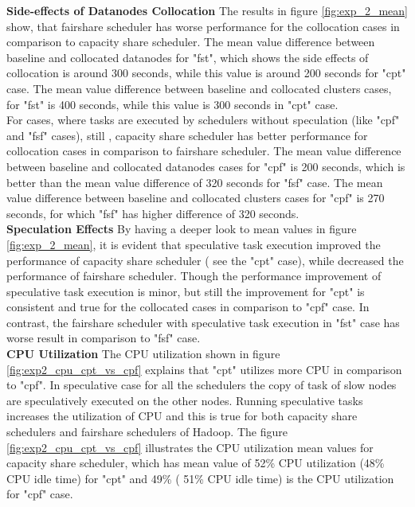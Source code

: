 \textbf{Side-effects of Datanodes Collocation } The results in figure \ref{fig:exp_2_mean} show, that fairshare scheduler has worse performance for the collocation cases in comparison to capacity share scheduler. The mean value difference between baseline and collocated datanodes for "fst", which shows the side effects of collocation is around 300 seconds, while this value is around 200 seconds for "cpt" case. The mean value difference between baseline and collocated clusters cases, for "fst" is 400 seconds, while this value is 300 seconds in "cpt" case.\\ 

For cases, where tasks are executed by schedulers without speculation (like "cpf" and "fsf" cases), still , capacity share scheduler has better performance for collocation cases in comparison to fairshare scheduler. The mean value difference between baseline and collocated datanodes cases for "cpf" is 200 seconds, which is better than the mean value difference of 320 seconds for "fsf" case. The mean value difference between baseline and collocated clusters cases for "cpf" is 270 seconds, for which "fsf" has higher difference of 320 seconds.\\ 


\textbf{Speculation Effects } By having a deeper look to mean values in figure \ref{fig:exp_2_mean}, it is evident that speculative task execution improved the performance of capacity share scheduler ( see the "cpt" case), while decreased the performance of fairshare scheduler. Though the performance improvement of speculative task execution is minor, but still the improvement for "cpt"‌ is consistent and true for the collocated cases in comparison to "cpf" case. In contrast, the  fairshare scheduler with speculative task execution in "fst" case has worse result in comparison to "fsf" case. \\  


\textbf{CPU Utilization} The CPU utilization shown in figure \ref{fig:exp2_cpu_cpt_vs_cpf} explains that "cpt" utilizes more CPU in comparison to "cpf". In speculative case for all the schedulers the copy of task of slow nodes are speculatively executed on the other nodes. Running speculative tasks increases the utilization of CPU and this is true for both capacity share schedulers and fairshare schedulers of Hadoop. The figure \ref{fig:exp2_cpu_cpt_vs_cpf} illustrates the CPU utilization mean values for capacity share scheduler, which has mean value of 52\% CPU utilization (48\% CPU idle time) for "cpt" and 49\% ( 51\% CPU idle time) is the CPU utilization for "cpf" case. \\
 
